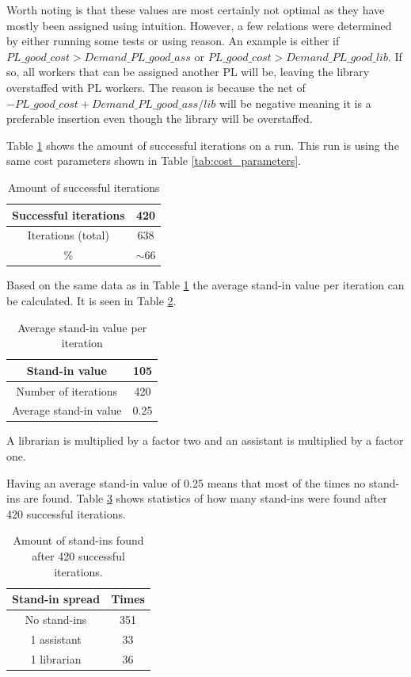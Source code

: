 Worth noting is that these values are most certainly not optimal as they have mostly been assigned using intuition. However, a few relations were determined by either running some tests or using reason. An example is either if $PL\_good\_cost > Demand\_PL\_good\_ass$ or $PL\_good\_cost > Demand\_PL\_good\_lib$. If so, all workers that can be assigned another PL will be, leaving the library overstaffed with PL workers. The reason is because the net of $-PL\_good\_cost + Demand\_PL\_good\_ass/lib$ will be negative meaning it is a preferable insertion even though the library will be overstaffed.

Table \ref{successful_iter} shows the amount of successful iterations on a run. This run is using the same cost parameters shown in Table \ref{tab:cost_parameters}. 
\begin{table}[!h]
\centering
\caption{Amount of successful iterations}
\label{successful_iter}
\begin{tabular}{|c|c|}
\hline
Successful iterations         & 420      \\ \hline
Iterations (total) & 638      \\ \hline
\%                 & $\sim$66 \\ \hline
\end{tabular}
\end{table}

Based on the same data as in Table \ref{successful_iter} the average stand-in value per iteration can be calculated. It is seen in Table \ref{tab:average_stand_ins}.
\begin{table}[!h]
\centering
\caption{Average stand-in value per iteration}
\label{tab:average_stand_ins}
\begin{tabular}{|c|c|}
\hline
Stand-in value & 105      \\ \hline
Number of iterations         & 420      \\ \hline
Average stand-in value      & 0.25 \\ \hline
\end{tabular}
\end{table}
A librarian is multiplied by a factor two and an assistant is multiplied by a factor one.

Having an average stand-in value of 0.25 means that most of the times no stand-ins are found. Table \ref{tab:stand_in_spread} shows statistics of how many stand-ins were found after 420 successful iterations. 
\begin{table}[!h]
\centering
\caption{Amount of stand-ins found after 420 successful iterations.}
\label{tab:stand_in_spread}
\begin{tabular}{|c|c|}
\hline
\rowcolor[HTML]{D2D2D2} 
Stand-in spread & Times \\ \hline
No stand-ins    & 351                      \\ \hline
1 assistant     & 33                      \\ \hline
1 librarian 	& 36 \\ \hline
\end{tabular}
\end{table}


